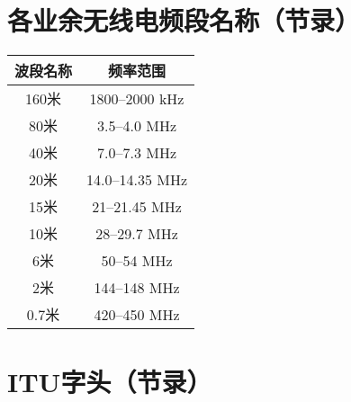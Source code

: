 \newpage






\section{各业余无线电频段名称（节录）}


\begin{longtable}{|c|c|}
	\hline
	\textbf{波段名称} & \textbf{频率范围} \\
	\hline
	160米 & 1800–2000 \si{\kHz} \\
	\hline
	80米 & 3.5–4.0 \si{\MHz} \\
	\hline
	40米 & 7.0–7.3 \si{\MHz} \\
	\hline
	20米 & 14.0–14.35 \si{\MHz} \\
	\hline
	15米 & 21–21.45 \si{\MHz} \\
	\hline
	10米 & 28–29.7 \si{\MHz} \\
	\hline
	6米 & 50–54 \si{\MHz} \\
	\hline
	2米 & 144–148 \si{\MHz} \\
	\hline
	0.7米 & 420–450 \si{\MHz} \\
	\hline
\end{longtable}

\newpage








\section{ITU字头（节录）}


